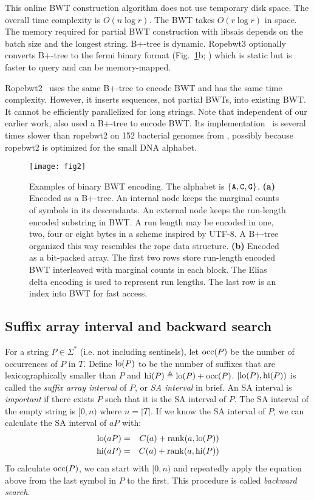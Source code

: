 \documentclass[webpdf,contemporary,large,namedate]{oup-authoring-template}%
\begin{document}
This online BWT construction algorithm does not use temporary disk space.
The overall time complexity is $O(n\log r)$.
The BWT takes $O(r\log r)$ in space.
The memory required for partial BWT construction with libsais depends on the batch size and the longest string.
B+-tree is dynamic.
Ropebwt3 optionally converts B+-tree to the fermi binary format (Fig.~\ref{fig:2}b; \citealt*{Li:2012fk})
which is static but is faster to query and can be memory-mapped.

Ropebwt2~\citep{Li:2014ab} uses the same B+-tree to encode BWT and has the same time complexity.
However, it inserts sequences, not partial BWTs, into existing BWT.
It cannot be efficiently parallelized for long strings.
Note that independent of our earlier work, \citet{DBLP:journals/jda/OhnoSTIS18} also used a B+-tree to encode BWT.
Its implementation~\citep{DBLP:journals/tcs/BannaiGI20} is several times slower than ropebwt2 on 152 bacterial genomes from \citet{Li:2024ab},
possibly because ropebwt2 is optimized for the small DNA alphabet.

\begin{figure}[bt]
\centering
\texttt{[image: fig2]}
\caption{Examples of binary BWT encoding.
The alphabet is $\{{\tt A},{\tt C},{\tt G}\}$.
{\bf (a)} Encoded as a B+-tree.
An internal node keeps the marginal counts of symbols in its descendants.
An external node keeps the run-length encoded substring in BWT.
A run length may be encoded in one, two, four or eight bytes in a scheme inspired by UTF-8.
A B+-tree organized this way resembles the rope data structure.
{\bf (b)} Encoded as a bit-packed array.
The first two rows store run-length encoded BWT interleaved with marginal counts in each block.
The Elias delta encoding is used to represent run lengths.
The last row is an index into BWT for fast access.
}\label{fig:2}
\end{figure}

\subsection{Suffix array interval and backward search}

For a string $P\in\Sigma^*$ (i.e. not including sentinels), let ${\rm occ}(P)$ be the number of occurrences of $P$ in $T$.
Define ${\rm lo}(P)$ to be the number of suffixes that are lexicographically smaller than $P$
and ${\rm hi}(P)\triangleq {\rm lo}(P)+{\rm occ}(P)$.
$[{\rm lo}(P),{\rm hi}(P))$ is called the \emph{suffix array interval} of $P$, or \emph{SA interval} in brief.
An SA interval is \emph{important} if there exists $P$ such that it is the SA interval of $P$.
The SA interval of the empty string is $[0,n)$ where $n=|T|$.
If we know the SA interval of $P$, we can calculate the SA interval of $aP$ with:
\begin{eqnarray*}
{\rm lo}(aP)&=&C(a)+{\rm rank}(a,{\rm lo}(P))\\
{\rm hi}(aP)&=&C(a)+{\rm rank}(a,{\rm hi}(P))
\end{eqnarray*}
To calculate ${\rm occ}(P)$,
we can start with $[0,n)$ and repeatedly apply the equation above from the last symbol in $P$ to the first.
This procedure is called \emph{backward search}.
\end{document}

